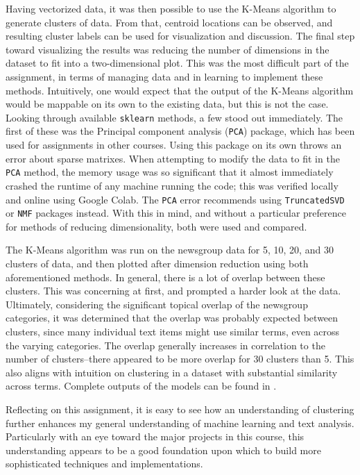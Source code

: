 \documentclass[11pt]{article}
\begin{document}
Having vectorized data, it was then possible to use the K-Means algorithm to generate clusters of data.
From that, centroid locations can be observed, and resulting cluster labels can be used for visualization and discussion.
The final step toward visualizing the results was reducing the number of dimensions in the dataset to fit into a two-dimensional plot.
This was the most difficult part of the assignment, in terms of managing data and in learning to implement these methods.
Intuitively, one would expect that the output of the K-Means algorithm would be mappable on its own to the existing data, but this is not the case.
Looking through available \lstinline{sklearn} methods, a few stood out immediately.
The first of these was the Principal component analysis (\lstinline{PCA}) package, which has been used for assignments in other courses.
Using this package on its own throws an error about sparse matrixes.
When attempting to modify the data to fit in the \lstinline{PCA} method, the memory usage was so significant that it almost immediately crashed the runtime of any machine running the code; this was verified locally and online using Google Colab.
The \lstinline{PCA} error recommends using \lstinline{TruncatedSVD} or \lstinline{NMF} packages instead.
With this in mind, and without a particular preference for methods of reducing dimensionality, both were used and compared.

The K-Means algorithm was run on the newsgroup data for 5, 10, 20, and 30 clusters of data, and then plotted after dimension reduction using both aforementioned methods.
In general, there is a lot of overlap between these clusters.
This was concerning at first, and prompted a harder look at the data.
Ultimately, considering the significant topical overlap of the newsgroup categories, it was determined that the overlap was probably expected between clusters, since many individual text items might use similar terms, even across the varying categories.
The overlap generally increases in correlation to the number of clusters--there appeared to be more overlap for 30 clusters than 5.
This also aligns with intuition on clustering in a dataset with substantial similarity across terms.
Complete outputs of the models can be found in .

Reflecting on this assignment, it is easy to see how an understanding of clustering further enhances my general understanding of machine learning and text analysis.
Particularly with an eye toward the major projects in this course, this understanding appears to be a good foundation upon which to build more sophisticated techniques and implementations.
\end{document}
